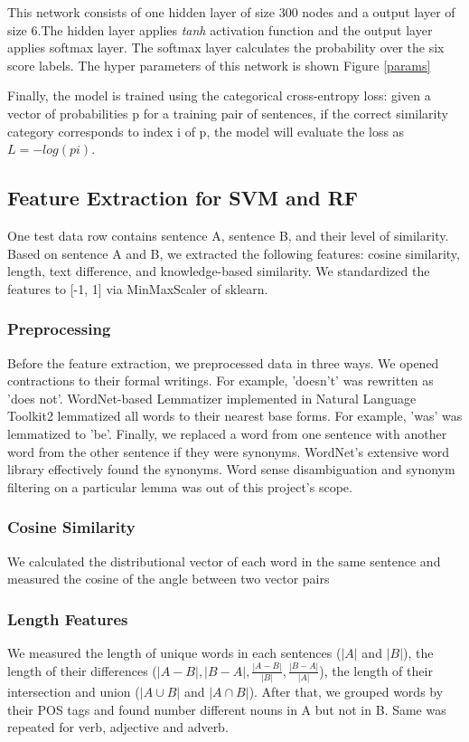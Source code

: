 \documentclass{article} %
\begin{document}
	 This network consists of one hidden layer of size 300 nodes and a output layer of size 6.The hidden layer applies \textit{tanh} activation function and the output layer applies softmax layer. The softmax layer calculates the probability over the six score labels. The hyper parameters of this network is shown Figure \ref{params}
	 
	 Finally, the model is trained using the categorical cross-entropy loss: given a vector of probabilities p for a training pair of sentences, if the correct similarity category corresponds to index i of p, the model will evaluate the loss as $L = − log(pi)$.
	 

     	\subsection{Feature Extraction for SVM and RF}
		One test data row contains sentence A, sentence  B, and their level of similarity. Based on sentence A and B, we extracted the following features: cosine similarity, length, text difference, and knowledge-based similarity. We standardized the features to [-1, 1] via MinMaxScaler of sklearn.

\subsubsection{Preprocessing}
Before the feature extraction, we preprocessed data in three ways. We opened contractions to their formal writings. For example, 'doesn’t' was rewritten as 'does not'. WordNet-based Lemmatizer implemented in Natural Language Toolkit2 lemmatized all words to their nearest base forms. For example, 'was' was lemmatized to 'be'. Finally, we replaced a word from one sentence with another word from the other sentence if they were synonyms. WordNet's extensive word library effectively found the synonyms. Word sense disambiguation and synonym filtering on a particular lemma was out of this project's scope.
 
\subsubsection{Cosine Similarity}
 We calculated the distributional vector of each word in the same sentence and measured the cosine of the angle between two vector pairs \cite{gomaa}

\subsubsection{Length Features}
We measured the length of unique words in each sentences ($|A|$ and $|B|$), the length of their differences ($|A-B|, |B-A|, \frac{|A-B|}{|B|},  \frac{|B-A|}{|A|}$), the length of their intersection and union ($|A \cup B|$ and $|A \cap B| $). After that, we grouped words by their POS tags and found number different nouns in A but not in B. Same was repeated for verb, adjective and adverb.
\end{document}
